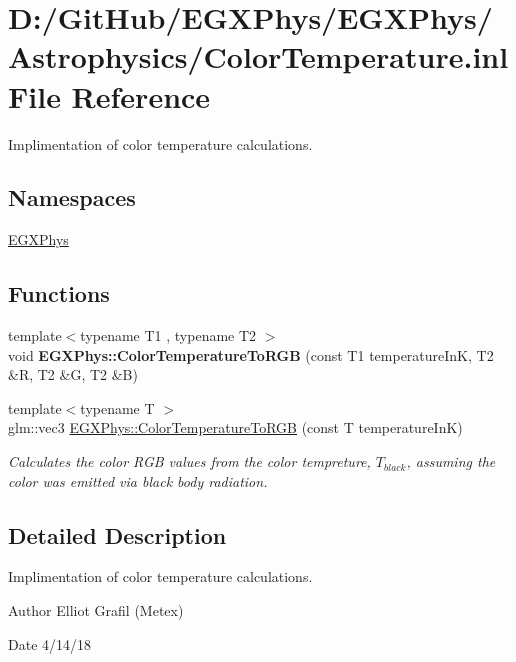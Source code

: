 \hypertarget{_color_temperature_8inl}{}\section{D\+:/\+Git\+Hub/\+E\+G\+X\+Phys/\+E\+G\+X\+Phys/\+Astrophysics/\+Color\+Temperature.inl File Reference}
\label{_color_temperature_8inl}


Implimentation of color temperature calculations.  


\subsection*{Namespaces}
\begin{DoxyCompactItemize}
\item 
 \mbox{\hyperlink{namespace_e_g_x_phys}{E\+G\+X\+Phys}}
\end{DoxyCompactItemize}
\subsection*{Functions}
\begin{DoxyCompactItemize}
\item 
\mbox{\label{namespace_e_g_x_phys_a53633ad397d0ee34ff0b5869f41c7c83}} 
{\footnotesize template$<$typename T1 , typename T2 $>$ }\\void {\bfseries E\+G\+X\+Phys\+::\+Color\+Temperature\+To\+R\+GB} (const T1 temperature\+InK, T2 \&R, T2 \&G, T2 \&B)
\item 
{\footnotesize template$<$typename T $>$ }\\glm\+::vec3 \mbox{\hyperlink{group___e_g_x_phys-_astrophysics-_color_temperature_gaad787485a232976da96c2c785ce21dad}{E\+G\+X\+Phys\+::\+Color\+Temperature\+To\+R\+GB}} (const T temperature\+InK)
\begin{DoxyCompactList}\small\item\em Calculates the color R\+GB values from the color tempreture, $T_{black}$, assuming the color was emitted via black body radiation. \end{DoxyCompactList}\end{DoxyCompactItemize}


\subsection{Detailed Description}
Implimentation of color temperature calculations. 

\begin{DoxyAuthor}{Author}
Elliot Grafil (Metex) 
\end{DoxyAuthor}
\begin{DoxyDate}{Date}
4/14/18 
\end{DoxyDate}

